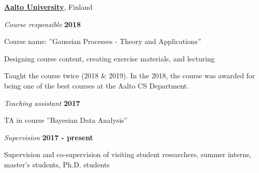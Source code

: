 \documentclass[10pt]{article}
\newcommand{\halfblankline}{\quad\vspace{-0.5\baselineskip}\pagebreak[3]}
\begin{document}
\href{http://www.dtu.dk/}{\textbf{Aalto University}},
Finland
\begin{outerlist}

\item[] \textit{Course responsible}%
            \hfill \textbf{2018}
            \begin{innerlist}
                \item Course name: ''Gaussian Processes - Theory and Applications''
                \item Designing course content, creating exercise materials, and  lecturing
                \item Taught the course twice (2018 \& 2019). In the 2018, the course was awarded for being one of the best courses at the Aalto CS Department.
            \end{innerlist}

\item[] \textit{Teaching assistant}%
            \hfill \textbf{2017}
            \begin{innerlist}
                \item TA in course ''Bayesian Data Analysis''
            \end{innerlist}



\item[] \textit{Supervision}%
            \hfill \textbf{2017 - present}
            \begin{innerlist}
                \item Supervision and co-supervision of visiting student researchers, summer interns, master's students, Ph.D. students
            \end{innerlist}





\end{outerlist}
\halfblankline
\end{document}
